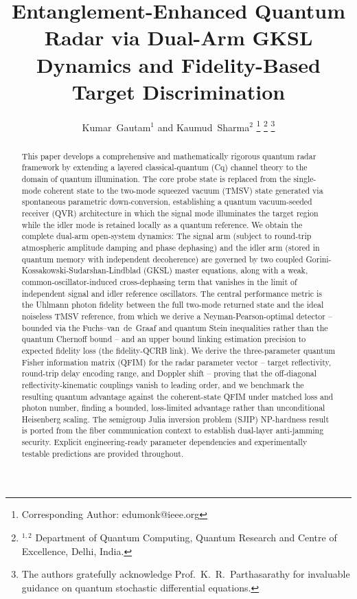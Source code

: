 \documentclass[journal]{IEEEtran}
\begin{document}
\title{Entanglement-Enhanced Quantum Radar via Dual-Arm GKSL Dynamics and Fidelity-Based Target Discrimination}

\author{Kumar~Gautam{$^1$} and Kaumud~Sharma{$^2$}
\thanks{Corresponding Author: edumonk@ieee.org}
\thanks{{$^{1,2}$} Department of Quantum Computing, Quantum Research and Centre of Excellence, Delhi, India.}
\thanks{The authors gratefully acknowledge Prof.~K.~R.~Parthasarathy for invaluable guidance on quantum stochastic differential equations.}
}

\maketitle

\begin{abstract}
This paper develops a comprehensive and mathematically rigorous quantum radar framework by extending a layered classical-quantum (Cq) channel theory to the domain of quantum illumination. The core probe state is replaced from the single-mode coherent state to the two-mode squeezed vacuum (TMSV) state generated via spontaneous parametric down-conversion, establishing a quantum vacuum-seeded receiver (QVR) architecture in which the signal mode illuminates the target region while the idler mode is retained locally as a quantum reference. We obtain the complete dual-arm open-system dynamics: The signal arm (subject to round-trip atmospheric amplitude damping and phase dephasing) and the idler arm (stored in quantum memory with independent decoherence) are governed by two coupled Gorini-Kossakowski-Sudarshan-Lindblad (GKSL) master equations, along with a weak, common-oscillator-induced cross-dephasing term that vanishes in the limit of independent signal and idler reference oscillators. The central performance metric is the Uhlmann photon fidelity between the full two-mode returned state and the ideal noiseless TMSV reference, from which we derive a Neyman-Pearson-optimal detector -- bounded via the Fuchs--van~de~Graaf and quantum Stein inequalities rather than the quantum Chernoff bound -- and an upper bound linking estimation precision to expected fidelity loss (the fidelity-QCRB link). We derive the three-parameter quantum Fisher information matrix (QFIM) for the radar parameter vector -- target reflectivity, round-trip delay encoding range, and Doppler shift -- proving that the off-diagonal reflectivity-kinematic couplings vanish to leading order, and we benchmark the resulting quantum advantage against the coherent-state QFIM under matched loss and photon number, finding a bounded, loss-limited advantage rather than unconditional Heisenberg scaling. The semigroup Julia inversion problem (SJIP) NP-hardness result is ported from the fiber communication context to establish dual-layer anti-jamming security. Explicit engineering-ready parameter dependencies and experimentally testable predictions are provided throughout.
\end{abstract}
\end{document}
